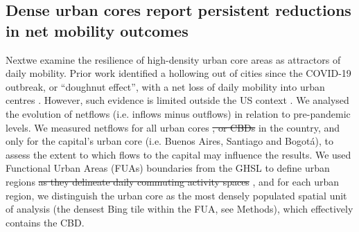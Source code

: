 \documentclass[fleqn,10pt]{wlscirep}
\providecommand{\DIFadd}[1]{{\protect\color{blue}\uwave{#1}}} %
\providecommand{\DIFdel}[1]{{\protect\color{red}\sout{#1}}}                      %
\providecommand{\DIFaddbegin}{} %
\providecommand{\DIFaddend}{} %
\providecommand{\DIFdelbegin}{} %
\providecommand{\DIFdelend}{} %
\begin{document}
\DIFdelend \subsection*{Dense urban cores report persistent reductions in net mobility outcomes}

Next\DIFaddbegin \DIFadd{, }\DIFaddend we examine the resilience of high-density urban core areas as attractors of daily mobility. Prior work identified a hollowing out of cities since the COVID-19 outbreak, or ``doughnut effect'', with a net loss of daily mobility into urban centres \cite{ramani2024working}. However, such evidence is limited outside the US context \cite{ramani2024working, gonzalez2023donut}. We analysed the evolution of netflows (i.e. inflows minus outflows) in relation to pre-pandemic levels. We measured netflows for all urban cores \DIFdelbegin \DIFdel{, or CBDs }\DIFdelend in the country, and only for the capital's urban core (i.e. Buenos Aires, Santiago and Bogotá), to assess the extent to which flows to the capital may influence the results. We used Functional Urban Areas (FUAs) boundaries from the GHSL to define urban regions \DIFdelbegin \DIFdel{as they delineate daily commuting activity spaces }\DIFdelend \cite{ceu.jrc.2019}, and for each urban region, we distinguish the urban core as the most densely populated spatial unit of analysis (the densest Bing tile within the FUA, see Methods), which effectively contains the CBD. 
\end{document}
